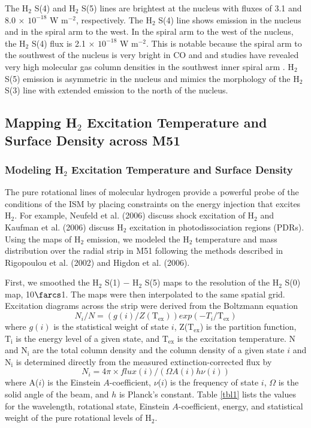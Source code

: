 \documentclass[manuscript]{aastex}
\begin{document}
The H$_2$ S(4) and H$_2$ S(5) lines are brightest at
the nucleus with fluxes of 3.1 and 8.0 $\times$
$\mathrm{10^{-18}}$ W $\mathrm{m^{-2}}$, respectively.  The H$_2$
S(4) line shows emission in the nucleus and in the spiral arm to the
west.  In the spiral arm to the west of the nucleus, the
H$_2$ S(4) flux is 2.1 $\times$ $\mathrm{10^{-18}}$ W
$\mathrm{m^{-2}}$.  This is notable because the spiral arm to the
southwest of the nucleus is very bright in CO and and studies have
revealed very high molecular gas column densities in the southwest
inner spiral arm \citep{lor90, aal99}.  H$_2$ S(5) emission is
asymmetric in the nucleus and mimics the morphology of the
H$_2$ S(3) line with extended emission to the north of the
nucleus.

\subsection{Mapping H$_2$ Excitation Temperature and Surface Density across M51}

\subsubsection{Modeling H$_2$ Excitation Temperature and Surface Density}

The pure rotational lines of molecular hydrogen provide a powerful
probe of the conditions of the ISM by placing constraints on the
energy injection that excites H$_2$.  For example, 
Neufeld et al. (2006) discuss shock excitation of H$_2$ and 
Kaufman et al. (2006) discuss H$_2$ excitation in photodissociation regions (PDRs).  
Using the maps of H$_2$ emission, we modeled the H$_2$ 
temperature and mass distribution over the radial strip in M51 
following the methods described in Rigopoulou et al. (2002) 
and Higdon et al. (2006).

First, we smoothed the H$_2$ S(1) $-$ H$_2$ S(5)
maps to the resolution of the H$_2$ S(0) map, 10$\farcs$1.
The maps were then interpolated to the same spatial grid.  Excitation
diagrams across the strip were derived from the Boltzmann equation
\begin{equation}
N_i/N = (g(i)/Z(\mathrm{T_{ex}}))exp(-T_i/\mathrm{T_{ex}})
\end{equation}
where $g(i)$ is the statistical weight of state $i$,
Z($\mathrm{T_{ex}}$) is the partition function, $\mathrm{T_i}$ is the
energy level of a given state, and $\mathrm{T_{ex}}$ is the excitation
temperature.  N and $\mathrm{N_i}$ are the total column density and
the column density of a given state $i$ and $\mathrm{N_i}$ is
determined directly from the measured extinction-corrected flux by
\begin{equation}
N_i = 4 \pi \times flux(i)/(\Omega A(i)h\nu (i))
\end{equation}
where A($i$) is the Einstein $A$-coefficient, $\nu$($i$) is the
frequency of state $i$, $\Omega$ is the solid angle of the beam, and
$h$ is Planck's constant.  Table \ref{tbl1} lists the values for the
wavelength, rotational state, Einstein $A$-coefficient, energy, and
statistical weight of the pure rotational levels of H$_2$.
\end{document}
